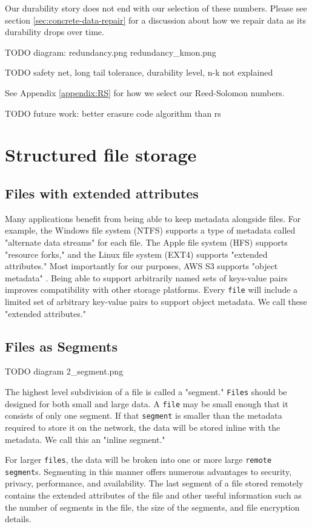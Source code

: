\documentclass[11pt,fleqn,openany]{book}
\newcommand{\x}[1]{{\tt #1}} \newcommand{\code}[1]{{\em #1}}
\newcommand{\todo}[1]{{\color{red} TODO #1 }}
\begin{document}
Our durability story does not end with our selection of these numbers.
Please see section \ref{sec:concrete-data-repair} for a discussion about
how we repair data as its durability drops over time.

\todo{diagram:
redundancy.png
redundancy\_kmon.png
}

\todo{safety net, long tail tolerance, durability level, n-k not explained}

See Appendix \ref{appendix:RS} for how we select our Reed-Solomon numbers.

\todo{future work: better erasure code algorithm than rs}

\section{Structured file storage}

\subsection{Files with extended attributes}

Many applications benefit from being able to keep metadata alongside files. For
example, the Windows file system (NTFS) supports a type of metadata called
"alternate data streams" for each file. The Apple file system (HFS) supports
"resource forks," and the Linux file system (EXT4) supports
"extended attributes." Most importantly for
our purposes, AWS S3 supports "object metadata" \cite{s3-object-meta}. Being
able to support arbitrarily named sets of keys-value pairs improves
compatibility with other storage platforms. Every \x{file} will include a
limited set of arbitrary key-value pairs to support object metadata. We call
these "extended attributes."

\subsection{Files as Segments}

\todo{diagram 2\_segment.png}

The highest level subdivision of a file is called a "segment."
\x{Files} should be designed for both small and large data.
A \x{file} may be small enough that it consists of only one segment.
If that \x{segment} is smaller than the metadata required to store it on the
network, the data will be stored inline with the metadata. We call this an
"inline segment."

For larger \x{files}, the data will be broken
into one or more large \x{remote segment}s. Segmenting in this manner offers
numerous advantages to security, privacy, performance, and availability. The
last segment of a file stored remotely contains the extended attributes of
the file and other useful information such as the number of segments in the
file, the size of the segments, and file encryption details.
\end{document}
